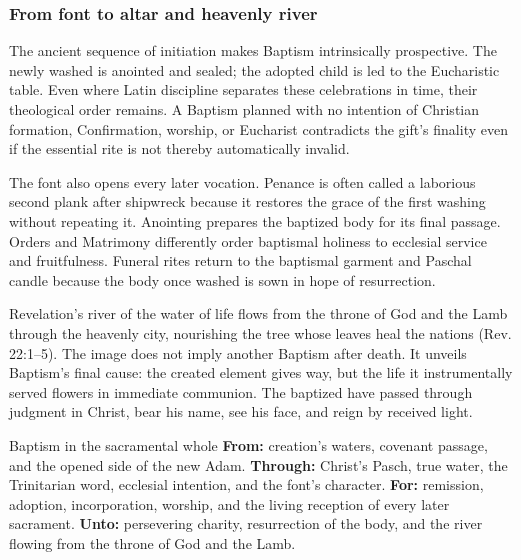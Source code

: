 \subsubsection{From font to altar and heavenly river}

The ancient sequence of initiation makes Baptism intrinsically prospective. The newly washed is anointed and sealed; the adopted child is led to the Eucharistic table. Even where Latin discipline separates these celebrations in time, their theological order remains. A Baptism planned with no intention of Christian formation, Confirmation, worship, or Eucharist contradicts the gift's finality even if the essential rite is not thereby automatically invalid.

The font also opens every later vocation. Penance is often called a laborious second plank after shipwreck because it restores the grace of the first washing without repeating it. Anointing prepares the baptized body for its final passage. Orders and Matrimony differently order baptismal holiness to ecclesial service and fruitfulness. Funeral rites return to the baptismal garment and Paschal candle because the body once washed is sown in hope of resurrection.

Revelation's river of the water of life flows from the throne of God and the Lamb through the heavenly city, nourishing the tree whose leaves heal the nations (Rev. 22:1--5). The image does not imply another Baptism after death. It unveils Baptism's final cause: the created element gives way, but the life it instrumentally served flowers in immediate communion. The baptized have passed through judgment in Christ, bear his name, see his face, and reign by received light.

\begin{massbox}{Baptism in the sacramental whole}
\textbf{From:} creation's waters, covenant passage, and the opened side of the new Adam. \textbf{Through:} Christ's Pasch, true water, the Trinitarian word, ecclesial intention, and the font's character. \textbf{For:} remission, adoption, incorporation, worship, and the living reception of every later sacrament. \textbf{Unto:} persevering charity, resurrection of the body, and the river flowing from the throne of God and the Lamb.
\end{massbox}
